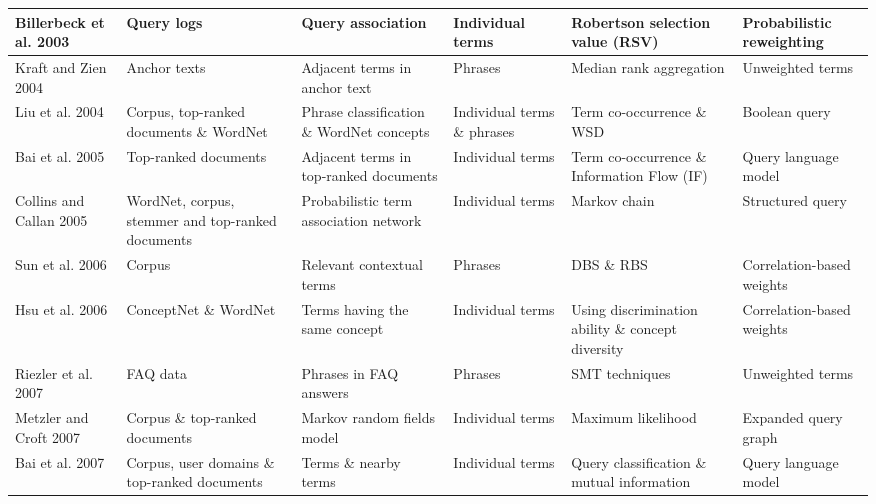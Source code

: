 \begin{landscape}
\begin{table}
{\begin{tabular}{ | M{3cm} | M{3cm} | M{3.2cm} | M{3cm} | M{3cm} | M{3cm} |}
				Billerbeck et al. 2003 \cite{billerbeck2003query} & Query logs & Query association   & Individual terms & Robertson selection value (RSV) & Probabilistic reweighting \\ \hline
				Kraft and Zien 2004 \cite{kraft2004mining} & Anchor texts & Adjacent terms in anchor text  & Phrases & Median rank aggregation & Unweighted terms \\ \hline
				Liu et al. 2004 \cite{liu2004effective} & Corpus, top-ranked documents \& WordNet & Phrase classification \& WordNet concepts  & Individual terms \& phrases & Term co-occurrence \& WSD & Boolean query \\ \hline
				Bai et al. 2005 \cite{bai2005query} & Top-ranked documents  & Adjacent terms in top-ranked documents  & Individual terms & Term co-occurrence \& Information Flow (IF)  & Query language model \\ \hline
				Collins  and Callan 2005 \cite{collins2005query} & WordNet, corpus, stemmer and top-ranked documents  & Probabilistic term association network & Individual terms & Markov chain & Structured query \\ \hline
				Sun et al. 2006 \cite{sun2006mining} & Corpus  & Relevant contextual terms  & Phrases  & DBS \& RBS & Correlation-based weights \\ \hline
				Hsu et al. 2006 \cite{hsu2006query} & ConceptNet \& WordNet  & Terms having the same concept  & Individual terms  & Using discrimination ability \& concept diversity & Correlation-based weights \\ \hline
				Riezler et al. 2007 \cite{riezler2007statistical} & FAQ data  & Phrases in FAQ answers  & Phrases & SMT techniques & Unweighted terms \\ \hline
				Metzler and Croft 2007 \cite{metzler2007latent} & Corpus \& top-ranked documents & Markov random fields model  & Individual terms & Maximum likelihood & Expanded query graph \\ \hline
				Bai et al. 2007 \cite{bai2007using} & Corpus, user domains \& top-ranked documents & Terms \& nearby terms  & Individual terms & Query classification \& mutual information & Query language model \\ \hline
			\end{tabular}
		}
	\end{table}
\end{landscape}


